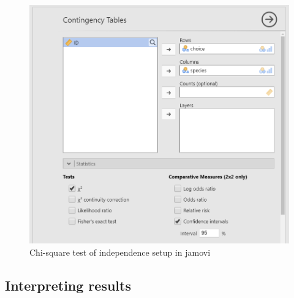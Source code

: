 \documentclass[
]{book}
\begin{document}
\begin{figure}

{\centering \includegraphics[width=0.8\linewidth]{images/11-independence/independence_setup} 

}

\caption{Chi-square test of independence setup in jamovi}\label{fig:unnamed-chunk-1}
\end{figure}

\hypertarget{interpreting-results-1}{%
\subsection{Interpreting results}\label{interpreting-results-1}}
\end{document}
